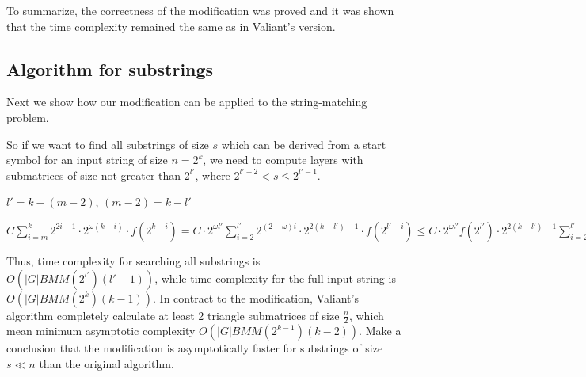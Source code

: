 To summarize, the correctness of the modification was proved and it was shown that the time complexity remained the same as in Valiant's version.

\subsection{Algorithm for substrings}

Next we show how our modification can be applied to the string-matching problem.

So if we want to find all substrings of size $s$ which can be derived from a start symbol for an input string of size $n = 2^k$, we need to compute layers with submatrices of size not greater than $2^{l'}$, where $2^{l' - 2} < s \le 2^{l' - 1}$.

$l' = k - (m - 2)$, $(m - 2) = k - l'$

$ C \sum\limits_{i=m}^k 2^{2i - 1} \cdot 2^{\omega(k - i)} \cdot f(2^{k - i}) = C \cdot 2^{\omega l'}\sum\limits_{i=2}^{l'} 2^{(2 - \omega)i} \cdot 2^{2(k - l') - 1} \cdot f(2^{l' - i}) \le C \cdot 2^{\omega l'} f(2^{l'}) \cdot 2^{2(k - l') - 1} \sum\limits_{i=2}^{l'} 2^{(2 - \omega)i} = BMM(2^{l'}) \cdot 2^{2(k - l') - 1} \sum\limits_{i=2}^{l'} 2^{(2 - \omega)i}$

Thus, time complexity for searching all substrings is  $O(|G|BMM(2^{l'})(l' - 1))$, while time complexity for the full input string is $O(|G|BMM(2^k)(k - 1))$. In contract to the modification, Valiant's algorithm completely calculate at least 2 triangle submatrices of size $\frac{n}{2}$, which mean minimum asymptotic complexity  $O(|G|BMM(2^{k - 1})(k - 2))$. Make a conclusion that the modification is asymptotically faster for substrings of size $s \ll n$  than the original algorithm.
